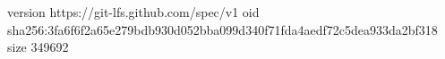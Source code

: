 version https://git-lfs.github.com/spec/v1
oid sha256:3fa6f6f2a65e279bdb930d052bba099d340f71fda4aedf72c5dea933da2bf318
size 349692
